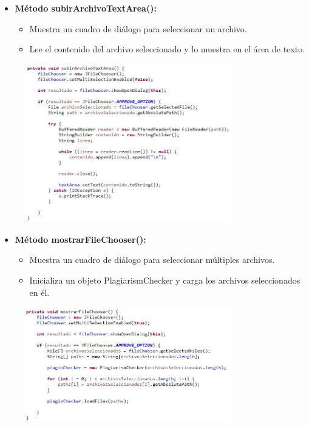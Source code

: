 \documentclass{article}
\begin{document}
	\begin{itemize}
	\item \textbf{Método subirArchivoTextArea():}
	 \begin{itemize}
	 \item Muestra un cuadro de diálogo para seleccionar un archivo.
	 \item Lee el contenido del archivo seleccionado y lo muestra en el área de texto.
	 \end{itemize}
	\end{itemize}
	 \begin{figure}[H]
		\centering
		\includegraphics[width=0.8\textwidth,keepaspectratio]{img/GUI7.jpg}
	\end{figure}
	
	\begin{itemize}
	\item \textbf{Método mostrarFileChooser():}
	 \begin{itemize}
	 \item Muestra un cuadro de diálogo para seleccionar múltiples archivos.
	 \item Inicializa un objeto PlagiarismChecker y carga los archivos seleccionados en él.
	 \end{itemize}
	\end{itemize}
	 \begin{figure}[H]
		\centering
		\includegraphics[width=0.8\textwidth,keepaspectratio]{img/GUI8.jpg}
	\end{figure}
	
\end{document}
